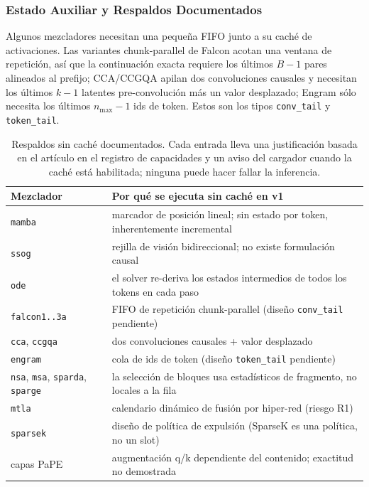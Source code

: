 \subsubsection{Estado Auxiliar y Respaldos Documentados}
\label{sec:kv-fallbacks}

Algunos mezcladores necesitan una pequeña FIFO junto a su caché de activaciones. Las variantes chunk-parallel de Falcon acotan una ventana de repetición, así que la continuación exacta requiere los últimos $B-1$ pares alineados al prefijo; CCA/CCGQA apilan dos convoluciones causales y necesitan los últimos $k-1$ latentes pre-convolución más un valor desplazado; Engram sólo necesita los últimos $n_{\max}-1$ ids de token. Estos son los tipos \texttt{conv\_tail} y \texttt{token\_tail}.

\begin{table}[H]
\centering
\small
\begin{tabularx}{0.98\linewidth}{l X}
\toprule
\textbf{Mezclador} & \textbf{Por qué se ejecuta sin caché en v1} \\
\midrule
\texttt{mamba} & marcador de posición lineal; sin estado por token, inherentemente incremental \\
\texttt{ssog} & rejilla de visión bidireccional; no existe formulación causal \\
\texttt{ode} & el solver re-deriva los estados intermedios de todos los tokens en cada paso \\
\texttt{falcon1..3a} & FIFO de repetición chunk-parallel (diseño \texttt{conv\_tail} pendiente) \\
\texttt{cca}, \texttt{ccgqa} & dos convoluciones causales + valor desplazado \\
\texttt{engram} & cola de ids de token (diseño \texttt{token\_tail} pendiente) \\
\texttt{nsa}, \texttt{msa}, \texttt{sparda}, \texttt{sparge} & la selección de bloques usa estadísticos de fragmento, no locales a la fila \\
\texttt{mtla} & calendario dinámico de fusión por hiper-red (riesgo R1) \\
\texttt{sparsek} & diseño de política de expulsión (SparseK es una política, no un slot) \\
capas PaPE & augmentación q/k dependiente del contenido; exactitud no demostrada \\
\bottomrule
\end{tabularx}
\caption{Respaldos sin caché documentados. Cada entrada lleva una justificación basada en el artículo en el registro de capacidades y un aviso del cargador cuando la caché está habilitada; ninguna puede hacer fallar la inferencia.}
\label{tab:kv-fallbacks}
\end{table}

